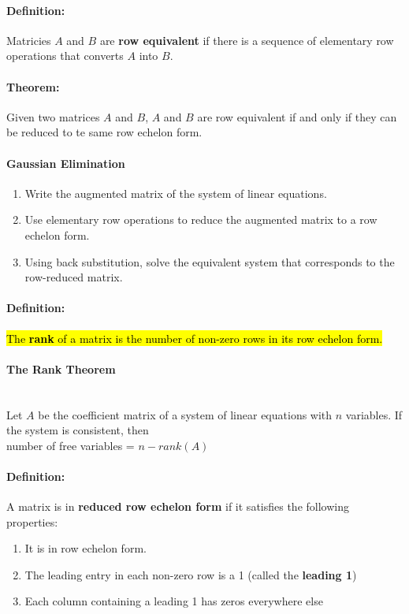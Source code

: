 \documentclass[12pt]{article}
\newenvironment{theorem}{\paragraph{Theorem:\hfill}}{\hfill}
\newenvironment{definition}{\paragraph{Definition: }}{\hfill}
\begin{document}
\begin{definition}
	Matricies $A$ and $B$ are \textbf{row equivalent} if there is a sequence of elementary row operations that converts $A$ into $B$.
\end{definition}

\begin{theorem}
	Given two matrices $A$ and $B$, $A$ and $B$ are row equivalent if and only if they can be reduced to te same row echelon form.
\end{theorem}

\paragraph{Gaussian Elimination}
\begin{enumerate}
	\item Write the augmented matrix of the system of linear equations.
	\item Use elementary row operations to reduce the augmented matrix to a row echelon form.
	\item Using back substitution, solve the equivalent system that corresponds to the row-reduced matrix.
\end{enumerate}

\begin{definition}
	\hl{The \textbf{rank} of a matrix is the number of non-zero rows in its row echelon form.}
\end{definition}

\paragraph{The Rank Theorem}
	\hfill
	\\
	Let $A$ be the coefficient matrix of a system of linear equations with $n$ variables. If the system is consistent, then\\
	\indent number of free variables = $n - rank(A)$
	
\begin{definition}
	A matrix is in \textbf{reduced row echelon form} if it satisfies the following properties:
	\begin{enumerate}
		\item It is in row echelon form.
		\item The leading entry in each non-zero row is a 1 (called the \textbf{leading 1})
		\item Each column containing a leading 1 has zeros everywhere else
	\end{enumerate}
\end{definition}
	
\end{document}
